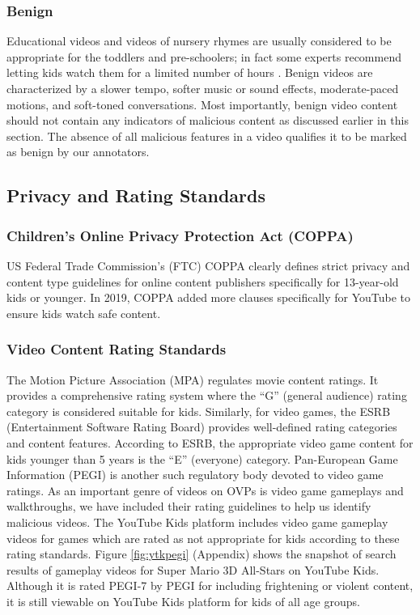 \documentclass[letterpaper]{article}
\begin{document}
\subsubsection{Benign} 
Educational videos and videos of nursery rhymes are usually considered to be appropriate for the toddlers and pre-schoolers; in fact some experts recommend letting kids watch them for a limited number of hours \cite{cdc_2019_positive}.  Benign videos are characterized by a slower tempo, softer music or sound effects, moderate-paced motions, and soft-toned conversations.  Most importantly, benign video content should not contain any indicators of malicious content as discussed earlier in this section. The absence of all malicious features in a video qualifies it to be marked as benign by our annotators.

\subsection{Privacy and Rating Standards}
\subsubsection{Children's Online Privacy Protection Act (COPPA)} US Federal Trade Commission's (FTC) COPPA clearly defines strict privacy and content type guidelines for online content publishers specifically for 13-year-old kids or younger. In 2019, COPPA added more clauses specifically for YouTube to ensure kids watch safe content. 
\subsubsection{Video Content Rating Standards} 
The Motion Picture Association (MPA) regulates movie content ratings. It provides a comprehensive rating system where the ``G'' (general audience) rating category is considered suitable for kids. Similarly, for video games, the ESRB (Entertainment Software Rating Board) provides well-defined rating categories and content features. According to ESRB, the appropriate video game content for kids younger than 5 years is the ``E'' (everyone) category. Pan-European Game Information (PEGI) is another such regulatory body devoted to video game ratings. As an important genre of videos on OVPs is video game gameplays and walkthroughs, we have included their rating guidelines to help us identify malicious videos. The YouTube Kids platform includes video game gameplay videos for games which are rated as not appropriate for kids according to these rating standards. Figure \ref{fig:ytkpegi} (Appendix) shows the snapshot of search results of gameplay videos for Super Mario 3D All-Stars on YouTube Kids. Although it is rated PEGI-7 by PEGI for including frightening or violent content, it is still viewable on YouTube Kids platform for kids of all age groups.
\end{document}
